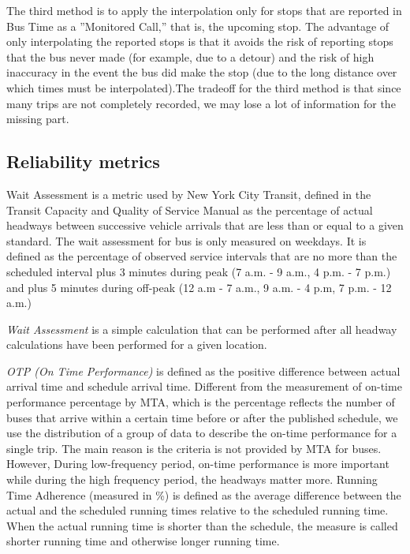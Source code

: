 \documentclass[12pt]{report}
\begin{document}
The third method is to apply the interpolation only for stops that are reported in Bus Time as a ''Monitored Call,'' that is, the upcoming stop. The advantage of only interpolating the reported stops is that it avoids the risk of reporting stops that the bus never made (for example, due to a detour) and the risk of high inaccuracy in the event the bus did make the stop (due to the long distance over which times must be interpolated).The tradeoff for the third method is that since many trips are not completely recorded, we may lose a lot of information for the missing part.

\subsection{Reliability metrics}

Wait Assessment is a metric used by New York City Transit, defined in the Transit Capacity and Quality of Service Manual as the percentage of actual headways between successive vehicle arrivals that are less than or equal to a given standard. The wait assessment for bus is only measured on weekdays. It is defined as the percentage of observed service intervals that are no more than the scheduled interval plus 3 minutes during peak (7 a.m. - 9 a.m., 4 p.m. - 7 p.m.) and plus 5 minutes during off-peak (12 a.m - 7 a.m., 9 a.m. - 4 p.m, 7 p.m. - 12 a.m.)

\textit{Wait Assessment} is a simple calculation that can be performed after all headway calculations have been performed for a given location.

\textit{OTP (On Time Performance)} is defined as the positive difference between actual arrival time and schedule arrival time. Different from the measurement of on-time performance percentage by MTA, which is the percentage reflects the number of buses that arrive within a certain time before or after the published schedule, we use the distribution of a group of data to describe the on-time performance for a single trip. The main reason is the criteria is not provided by MTA for buses. However, During low-frequency period, on-time performance is more important while during the high frequency period, the headways matter more. Running Time Adherence (measured in \%) is defined as the average difference between the actual and the scheduled running times relative to the scheduled running time. When the actual running time is shorter than the schedule, the measure is called shorter running time and otherwise longer running time.
\end{document}
